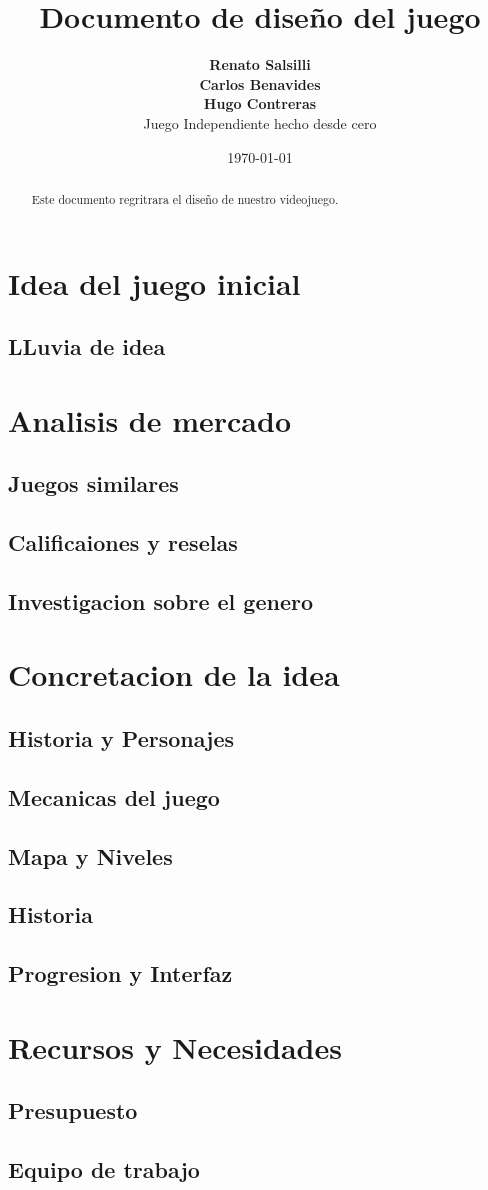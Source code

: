 \documentclass[11pt, a4paper]{article}
\title{\textbf{Documento de diseño del juego}}
\author{\textbf{Renato Salsilli} \\ \textbf{Carlos Benavides} \\ \textbf{Hugo Contreras} \\ Juego Independiente hecho desde cero}
\date{\today}
\begin{document}
\maketitle

\newpage

\begin{abstract}
Este documento regritrara el diseño de nuestro videojuego.
\end{abstract}

\section{Idea del juego inicial}
    \subsection{LLuvia de idea}
\section{Analisis de mercado}
    \subsection{Juegos similares}
    \subsection{Calificaiones y reselas}
    \subsection{Investigacion sobre el genero}
\section{Concretacion de la idea}
    \subsection{Historia y Personajes}
    \subsection{Mecanicas del juego}
    \subsection{Mapa y Niveles}
    \subsection{Historia}
    \subsection{Progresion y Interfaz}
\section{Recursos y Necesidades}
    \subsection{Presupuesto}
    \subsection{Equipo de trabajo}
\end{document}
